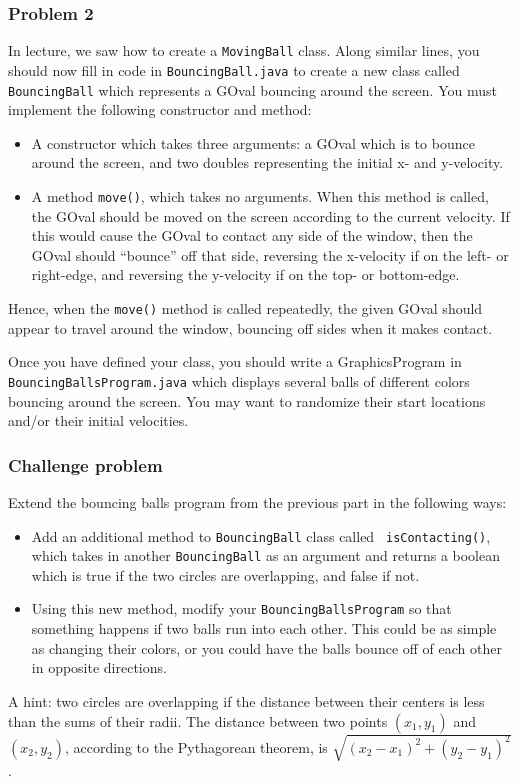 \documentclass[11pt]{article}
\theoremstyle{plain}
\theoremstyle{definition}
\theoremstyle{remark}
\begin{document}
\subsubsection*{Problem 2}
In lecture, we saw how to create a {\tt MovingBall} class. Along similar lines,
you should now fill in code in {\tt BouncingBall.java} to create a new class
called {\tt BouncingBall} which represents a GOval bouncing around the screen.
You must implement the following constructor and method:
\begin{itemize}
  \item A constructor which takes three arguments: a GOval which is to bounce
    around the screen, and two doubles representing the initial x- and
    y-velocity.
  \item A method {\tt move()}, which takes no arguments. When this method is
    called, the GOval should be moved on the screen according to the current
    velocity. If this would cause the GOval to contact any side of the window,
    then the GOval should ``bounce'' off that side, reversing the x-velocity if
    on the left- or right-edge, and reversing the y-velocity if on the top- or
    bottom-edge.
\end{itemize}
Hence, when the {\tt move()} method is called repeatedly, the given GOval
should appear to travel around the window, bouncing off sides when it makes
contact.

Once you have defined your class, you should write a GraphicsProgram in {\tt
BouncingBallsProgram.java} which displays several balls of different colors
bouncing around the screen. You may want to randomize their start locations
and/or their initial velocities.
\subsubsection*{Challenge problem}
Extend the bouncing balls program from the previous part in the following ways:
\begin{itemize}
  \item Add an additional method to {\tt BouncingBall} class called {\tt
    isContacting()}, which takes in another {\tt BouncingBall} as an argument
    and returns a boolean which is true if the two circles are overlapping, and
    false if not.
  \item Using this new method, modify your {\tt BouncingBallsProgram} so that
    something happens if two balls run into each other. This could be as simple
    as changing their colors, or you could have the balls bounce off of each
    other in opposite directions.
\end{itemize}
A hint: two circles are overlapping if the distance between their centers is
less than the sums of their radii. The distance between two points $(x_1, y_1)$
and $(x_2, y_2)$, according to the Pythagorean theorem, is $\sqrt{(x_2 - x_1)^2
+ (y_2 - y_1)^2}$.
\end{document}
